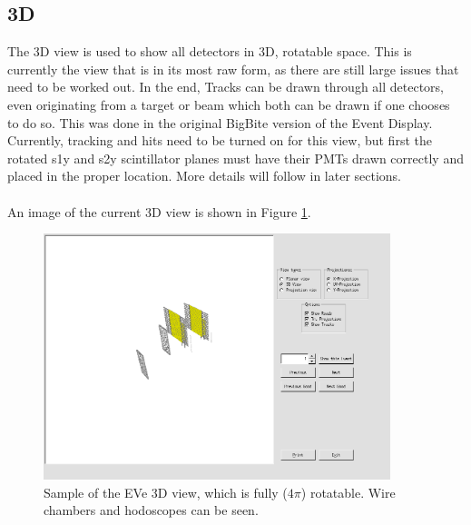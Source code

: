 \documentclass[12pt]{article}
\numberwithin{equation}{section}
\begin{document}
\subsection{3D}
The 3D view is used to show all detectors in 3D, rotatable space. This is currently the view that is in its most raw form, as there are still large issues that need to be worked out. In the end, Tracks can be drawn through all detectors, even originating from a target or beam which both can be drawn if one chooses to do so. This was done in the original BigBite version of the Event Display. Currently, tracking and hits need to be turned on for this view, but first the rotated s1y and s2y scintillator planes must have their PMTs drawn correctly and placed in the proper location. More details will follow in later sections.
\\
\\
An image of the current 3D view is shown in Figure \ref{fig:3D}.
\begin{figure}[h!]
	\caption{Sample of the EVe 3D view, which is fully ($4\pi$) rotatable. Wire chambers and hodoscopes can be seen.} \label{fig:3D}
	\centering
	\includegraphics[width=0.9\textwidth]{3DView.png} 
\end{figure}  
\end{document}
